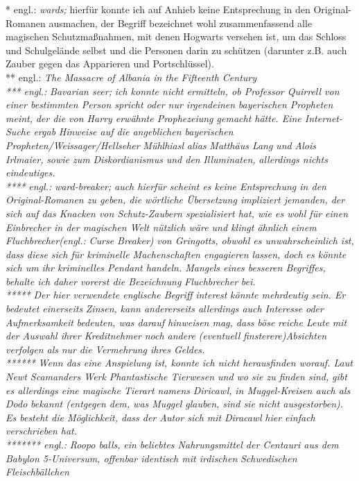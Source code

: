 {* engl.: \emph{wards;} hierfür konnte ich auf Anhieb keine Entsprechung in den Original-Romanen ausmachen, der Begriff bezeichnet wohl zusammenfassend alle magischen Schutzmaßnahmen, mit denen Hogwarts versehen ist, um das Schloss und Schulgelände selbst und die Personen darin zu schützen (darunter z.B. auch Zauber gegen das Apparieren und Portschlüssel).\\ ** engl.: \emph{The Massacre of Albania in the Fifteenth Century}\\ \emph{*** engl.:} \emph{\emph{Bavarian seer;}} \emph{ich konnte nicht ermitteln, ob Professor Quirrell von einer bestimmten Person spricht oder nur irgendeinen} \emph{bayerischen Propheten meint,} \emph{der die von Harry erwähnte Prophezeiung gemacht hätte. Eine Internet-Suche ergab} \emph{Hinweise auf die angeblichen bayerischen Propheten/Weissager/Hellseher} \emph{\emph{Mühlhiasl}} \emph{alias} \emph{\emph{Matthäus Lang}} \emph{und} \emph{\emph{Alois Irlmaier,}} \emph{sowie zum} \emph{\emph{Diskordianismus}} \emph{und den} \emph{\emph{Illuminaten,}} \emph{allerdings nichts eindeutiges.}\\ \emph{****} \emph{engl.:} \emph{\emph{ward-breaker;}} \emph{auch hierfür scheint es keine Entsprechung in den Original-Romanen zu geben, die wörtliche Übersetzung impliziert jemanden, der sich auf das Knacken von Schutz-Zaubern spezialisiert hat, wie es wohl für einen Einbrecher in der magischen Welt nützlich wäre und klingt ähnlich einem} \emph{\emph{Fluchbrecher}(engl.:} \emph{\emph{Curse Breaker})} \emph{von Gringotts, obwohl es unwahrscheinlich ist, dass diese sich für kriminelle Machenschaften engagieren lassen, doch es könnte sich um ihr kriminelles Pendant handeln. Mangels eines besseren Begriffes, behalte ich daher vorerst die Bezeichnung} \emph{\emph{Fluchbrecher}} \emph{bei.}\\ \emph{*****} \emph{Der hier verwendete englische Begriff} \emph{\emph{interest}} \emph{könnte mehrdeutig sein. Er bedeutet einerseits} \emph{\emph{Zinsen,}} \emph{kann andererseits allerdings auch} \emph{\emph{Interesse}} \emph{oder} \emph{\emph{Aufmerksamkeit}} \emph{bedeuten, was darauf hinweisen mag, dass} \emph{\emph{böse}} \emph{reiche Leute} \emph{mit der Auswahl ihrer Kredit\emph{nehmer}} \emph{noch andere} \emph{(eventuell} \emph{finsterere)Absichten} \emph{verfolgen als} \emph{nur} \emph{die Vermehrung ihres Geldes.}\\ \emph{******} \emph{Wenn das eine Anspielung ist, konnte ich nicht herausfinden worauf. Laut Newt Scamanders Werk} \emph{\emph{Phantastische Tierwesen und wo sie zu finden sind,}} \emph{gibt es allerdings eine magische Tierart namens} \emph{\emph{Diricawl,}} \emph{in Muggel-Kreisen auch als} \emph{\emph{Dodo}} \emph{bekannt (entgegen dem, was Muggel glauben, sind sie nicht ausgestorben). Es besteht die Möglichkeit, dass der Autor sich mit} \emph{\emph{Diracawl}} \emph{hier einfach verschrieben hat.}\\ \emph{******* engl.:} \emph{\emph{Roopo balls,}} \emph{ein beliebtes Nahrungsmittel der Centauri aus dem} \emph{\emph{Babylon 5}-Universum, offenbar identisch mit irdischen} \emph{\emph{Schwedischen Fleischbällchen}} }
